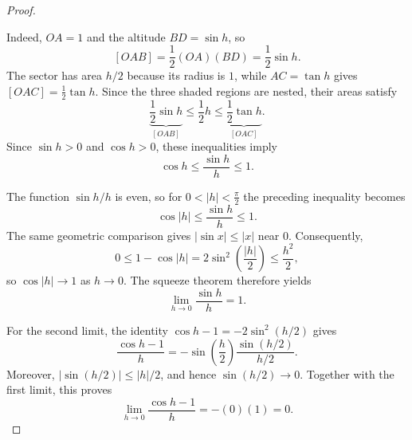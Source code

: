 \begin{proof}
\begin{subproof}
\begin{center}
        \end{center}
        Indeed, \(OA=1\) and the altitude \(BD=\sin h\), so
        \[
            [OAB]=\frac12(OA)(BD)=\frac12\sin h.
        \]
        The sector has area \(h/2\) because its radius is \(1\), while
        \(AC=\tan h\) gives \([OAC]=\frac12\tan h\).  Since the three shaded
        regions are nested, their areas satisfy
        \[
            \underbrace{\frac{1}{2}\sin h}_{[OAB]}
            \leq \frac{1}{2}h
            \leq
            \underbrace{\frac{1}{2}\tan h}_{[OAC]}.
        \]
        Since \(\sin h>0\) and \(\cos h>0\), these inequalities imply
        \[
            \cos h \leq \frac{\sin h}{h} \leq 1.
        \]
    \end{subproof}

    The function \(\sin h/h\) is even, so for
    \(0<|h|<\frac{\pi}{2}\) the preceding inequality becomes
    \[
        \cos |h| \leq \frac{\sin h}{h} \leq 1.
    \]
    The same geometric comparison gives
    \(\lvert\sin x\rvert\leq\lvert x\rvert\) near \(0\).  Consequently,
    \[
        0\leq 1-\cos|h|
        =2\sin^2\!\left(\frac{|h|}{2}\right)
        \leq \frac{h^2}{2},
    \]
    so \(\cos|h|\to1\) as \(h\to0\).  The squeeze theorem therefore yields
    \[
        \lim_{h\to0}\frac{\sin h}{h}=1.
    \]

    For the second limit, the identity
    \(\cos h-1=-2\sin^2(h/2)\) gives
    \[
        \frac{\cos h-1}{h}
        =-\sin\!\left(\frac{h}{2}\right)
          \frac{\sin(h/2)}{h/2}.
    \]
    Moreover, \(\lvert\sin(h/2)\rvert\leq |h|/2\), and hence
    \(\sin(h/2)\to0\).  Together with the first limit, this proves
    \[
        \lim_{h\to0}\frac{\cos h-1}{h}
        =-(0)(1)=0.
    \]
\end{proof}

